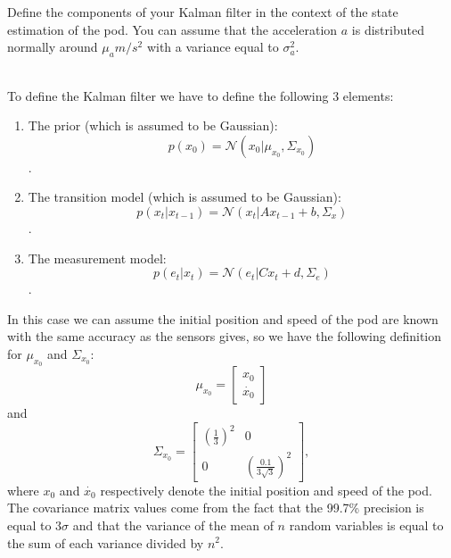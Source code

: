 \documentclass[9pt,a4paper]{extarticle}
\newenvironment{solution}
    {%
    \color{red}
    }
    { 
    \color{black}
    }
\begin{document}
   Define the components of your Kalman filter in the context of the state estimation of the pod. You can assume that the acceleration $a$ is distributed normally around $\mu_a m/s^2$ with a variance equal to $\sigma_a^2$.
   \begin{solution}
   \\
   To define the Kalman filter we have to define the following 3 elements:
   \begin{enumerate}
       \item The prior (which is assumed to be Gaussian): 
       $$ p(x_0) = \mathcal{N}(x_0|\mu_{x_0}, \Sigma_{x_0}) $$.
       \item The transition model (which is assumed to be Gaussian): 
       $$ p(x_t|x_{t-1}) = \mathcal{N}(x_t|Ax_{t-1}+b, \Sigma_{x}) $$.
       \item The measurement model:
       $$ p(e_t|x_t) =  \mathcal{N}(e_t|Cx_{t} + d, \Sigma_{e})$$.
   \end{enumerate}
   In this case we can assume the initial position and speed of the pod are known with the same accuracy as the sensors gives, so we have the following definition for $\mu_{x_0}$ and $\Sigma_{x_0}$:\\
   $$\mu_{x_0} = \begin{bmatrix}x_0 \\ \dot{x_0}\end{bmatrix}$$ and
   $$\Sigma_{x_0} = 
   \begin{bmatrix} 
    (\frac{1}{3})^2 &0\\
   0 & (\frac{0.1}{3\sqrt{3}})^2
   \end{bmatrix},$$
   where $x_0$ and $\dot{x_0}$ respectively denote the initial position and speed of the pod. The covariance matrix values come from the fact that the 99.7\% precision is equal to $3\sigma$ and that the variance of the mean of $n$ random variables is equal to the sum of each variance divided by $n^2$.
   

\end{solution}
\end{document}
